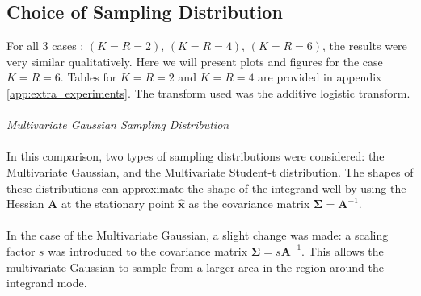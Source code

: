 \subsection{Choice of Sampling Distribution}

For all 3 cases : \((K=R=2)\), \((K=R=4)\), \((K=R=6)\), the results were very similar qualitatively. Here we will present plots and figures for the case \(K=R=6\). Tables for \(K=R=2\) and \(K=R=4\) are provided in appendix \ref{app:extra_experiments}. The transform used was the additive logistic transform.
\\\\
\textit{{\large Multivariate Gaussian Sampling Distribution}}
\\\\
In this comparison, two types of sampling distributions were considered: the Multivariate Gaussian, and the Multivariate Student-t distribution. The shapes of these distributions can approximate the shape of the integrand well by using the Hessian \(\mathbf{A}\) at the stationary point \(\mathbf{\hat{x}}\) as the covariance matrix \(\boldsymbol{\Sigma} = \mathbf{A}^{-1}\).
\\\\
In the case of the Multivariate Gaussian, a slight change was made: a scaling factor \(s\) was introduced to the covariance matrix \(\boldsymbol{\Sigma} = s\mathbf{A}^{-1}\). This allows the multivariate Gaussian to sample from a larger area in the region around the integrand mode. 
\\\\
